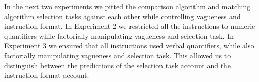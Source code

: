 In the next two experiments we pitted the comparison algorithm and matching algorithm selection tasks against each other while controlling vagueness and instruction format. In Experiment 2 we restricted all the instructions to numeric quantifiers while factorially manipulating vagueness and selection task. In Experiment 3 we ensured that all instructions used verbal quantifiers, while also factorially manipulating vagueness and selection task. This allowed us to distinguish between the predictions of the selection task account and the instruction format account. 
